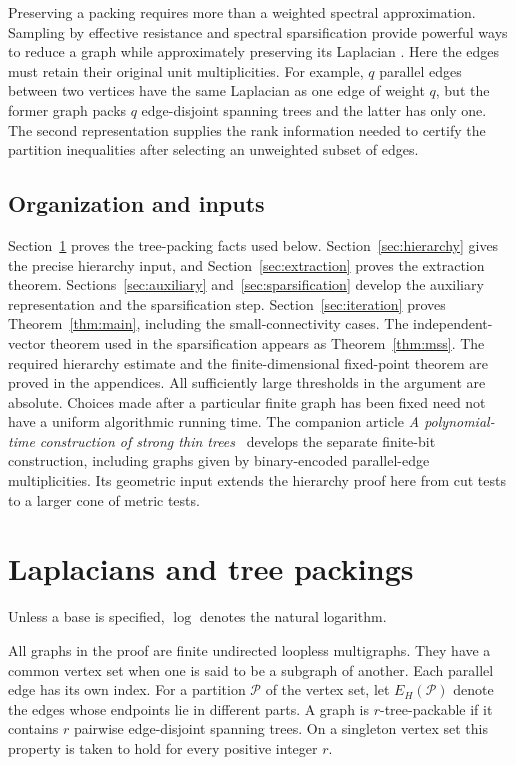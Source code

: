 \documentclass[11pt]{amsart}
\theoremstyle{definition}
\theoremstyle{remark}
\numberwithin{equation}{section}
\begin{document}
Preserving a packing requires more than a weighted spectral
approximation. Sampling by effective resistance and spectral
sparsification provide powerful ways to reduce a graph while
approximately preserving its Laplacian
\cite{SpielmanSrivastava2011,BatsonSpielmanSrivastava2012}.
Here the edges must retain their original unit multiplicities.
For example, \(q\) parallel edges between two vertices have the same
Laplacian as one edge of weight \(q\), but the former graph packs
\(q\) edge-disjoint spanning trees and the latter has only one.
The second representation supplies the rank information needed to
certify the partition inequalities after selecting an unweighted
subset of edges.

\subsection*{Organization and inputs}

Section~\ref{sec:preliminaries} proves the tree-packing facts used below.
Section~\ref{sec:hierarchy} gives the precise hierarchy input, and
Section~\ref{sec:extraction} proves the extraction theorem.
Sections~\ref{sec:auxiliary} and~\ref{sec:sparsification} develop the
auxiliary representation and the sparsification step.
Section~\ref{sec:iteration} proves Theorem~\ref{thm:main}, including
the small-connectivity cases.
The independent-vector theorem used in the sparsification appears
as Theorem~\ref{thm:mss}. The required hierarchy estimate and the
finite-dimensional fixed-point theorem are proved in the appendices.
All sufficiently large thresholds in the argument are absolute.
Choices made after a particular finite graph has been fixed need
not have a uniform algorithmic running time.
The companion article \emph{A polynomial-time construction of strong
thin trees}~\cite{ConstructiveThinTreesCompanion} develops the
separate finite-bit construction, including graphs given by
binary-encoded parallel-edge multiplicities. Its geometric input
extends the hierarchy proof here from cut tests to a larger cone of
metric tests.

\section{Laplacians and tree packings}\label{sec:preliminaries}

Unless a base is specified, $\log$ denotes the natural logarithm.

All graphs in the proof are finite undirected loopless multigraphs.
They have a common vertex set when one is said to be a subgraph of
another. Each parallel edge has its own index.
For a partition \(\mathcal P\) of the vertex set, let
\(E_H(\mathcal P)\) denote the edges whose endpoints lie in different
parts. A graph is \(r\)-tree-packable if it contains \(r\) pairwise
edge-disjoint spanning trees. On a singleton vertex set this property
is taken to hold for every positive integer \(r\).
\end{document}
